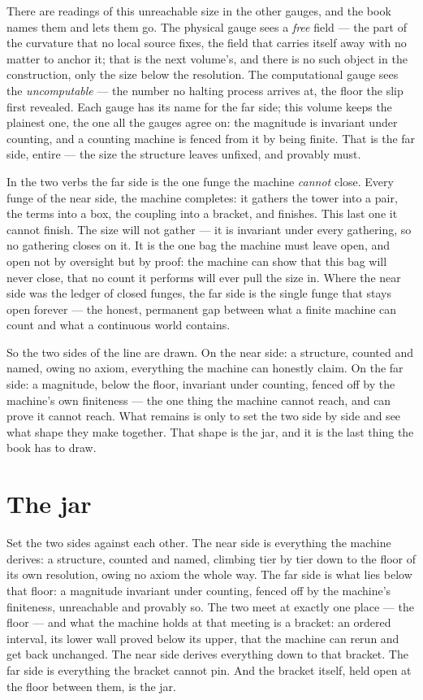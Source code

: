 There are readings of this unreachable size in the other gauges, and the book names them and lets them go. The physical
gauge sees a \emph{free} field --- the part of the curvature that no local source fixes, the field that carries itself
away with no matter to anchor it; that is the next volume's, and there is no such object in the construction, only the
size below the resolution. The computational gauge sees the \emph{uncomputable} --- the number no halting process
arrives at, the floor the slip first revealed. Each gauge has its name for the far side; this volume keeps the plainest
one, the one all the gauges agree on: the magnitude is invariant under counting, and a counting machine is fenced from
it by being finite. That is the far side, entire --- the size the structure leaves unfixed, and provably must.

In the two verbs the far side is the one funge the machine \emph{cannot} close. Every funge of the near side, the
machine completes: it gathers the tower into a pair, the terms into a box, the coupling into a bracket, and finishes.
This last one it cannot finish. The size will not gather --- it is invariant under every gathering, so no gathering
closes on it. It is the one bag the machine must leave open, and open not by oversight but by proof: the machine can
show that this bag will never close, that no count it performs will ever pull the size in. Where the near side was the
ledger of closed funges, the far side is the single funge that stays open forever --- the honest, permanent gap between
what a finite machine can count and what a continuous world contains.

So the two sides of the line are drawn. On the near side: a structure, counted and named, owing no axiom, everything
the machine can honestly claim. On the far side: a magnitude, below the floor, invariant under counting, fenced off by
the machine's own finiteness --- the one thing the machine cannot reach, and can prove it cannot reach. What remains is
only to set the two side by side and see what shape they make together. That shape is the jar, and it is the last thing
the book has to draw.

\section{The jar}

Set the two sides against each other. The near side is everything the machine derives: a structure, counted and named,
climbing tier by tier down to the floor of its own resolution, owing no axiom the whole way. The far side is what lies
below that floor: a magnitude invariant under counting, fenced off by the machine's finiteness, unreachable and
provably so. The two meet at exactly one place --- the floor --- and what the machine holds at that meeting is a
bracket: an ordered interval, its lower wall proved below its upper, that the machine can rerun and get back unchanged.
The near side derives everything down to that bracket. The far side is everything the bracket cannot pin. And the
bracket itself, held open at the floor between them, is the jar.

